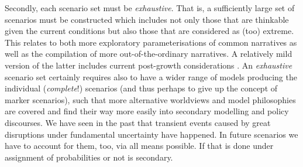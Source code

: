 \documentclass{article}
\begin{document}
\begin{refsection}
Secondly, each scenario set must be \textit{exhaustive}. That is, a sufficiently large set of scenarios must be constructed which includes not only those that are thinkable given the current conditions but also those that are considered as (too) extreme. This relates to both more exploratory parameterisations of common narratives as well as the compilation of more out-of-the-ordinary narratives. A relatively mild version of the latter includes current post-growth considerations \parencite{hickel_2021}. An \textit{exhaustive} scenario set certainly requires also to have a wider range of models producing the individual (\textit{complete}!) scenarios (and thus perhaps to give up the concept of marker scenarios), such that more alternative worldviews and model philosophies are covered and find their way more easily into secondary modelling and policy discourses.\footnotemark{} We have seen in the past that transient events caused by great disruptions under fundamental uncertainty have happened. In future scenarios we have to account for them, too, via all means possible. If that is done under assignment of probabilities or not is secondary.



\end{refsection}
\end{document}
